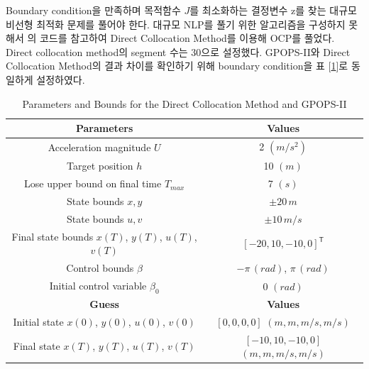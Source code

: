 Boundary condition을 만족하며 목적함수 $J$를 최소화하는 결정변수 $\mathrm{z}$를 찾는 대규모 비선형 최적화 문제를 풀어야 한다.
대규모 NLP를 풀기 위한 알고리즘을 구성하지 못해서 \citep{kellyDirectCollocation}의 코드를 참고하여 Direct Collocation Method를 이용해 OCP를 풀었다.
Direct collocation method의 segment 수는 30으로 설정했다.
GPOPS-II와 Direct Collocation Method의 결과 차이를 확인하기 위해 boundary condition을 표 [\ref{tab5}]로 동일하게 설정하였다.

\begin{table}[H]
	\begin{tabular}{|c|c|}
		\hline
		\textbf{Parameters}                               & \textbf{Values}                        \\
		\hline
		Acceleration magnitude $U$                        & 2 $(m/s^2)$                            \\
		\hline
		Target position $h$                               & 10 $(m)$                               \\
		\hline
		Lose upper bound on final time $T_{max}$          & 7 $(s)$                                \\
		\hline
		State bounds $x, y$                               & $\pm 20\,m$                            \\
		State bounds $u, v$                               & $\pm 10\,m/s$                          \\
		\hline
		Final state bounds $x(T)$, $y(T)$, $u(T)$, $v(T)$ & $[-20, 10, -10, 0]^\mathsf{T}$\\
		\hline
		Control bounds $\beta$                            & $-\pi\,(rad)$, $\pi\,(rad)$            \\
		\hline
		Initial control variable $\beta_0$                & 0 $(rad)$                              \\
		\hline
		\hline
		\textbf{Guess}                                    & \textbf{Values}                        \\
		\hline
		Initial state $x(0)$, $y(0)$, $u(0)$, $v(0)$      & $[0, 0, 0, 0]$ $(m, m, m/s, m/s)$      \\
		\hline
		Final state $x(T)$, $y(T)$, $u(T)$, $v(T)$        & $[-10, 10, -10, 0]$ $(m, m, m/s, m/s)$ \\
		\hline
	\end{tabular}
	\centering
	\caption{Parameters and Bounds for the Direct Collocation Method and GPOPS-II}
	\label{tab5}
\end{table}

